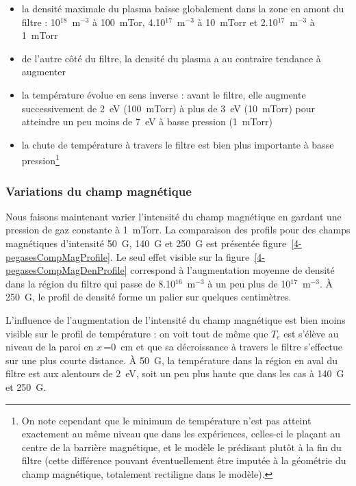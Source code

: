 \begin{refsection}
	\begin{itemize}
	  \item la densité maximale du plasma baisse globalement dans la zone en amont
	  du filtre : 10$^{18}$~m$^{-3}$ à 100~mTor, 4.10$^{17}$~m$^{-3}$ à 10~mTorr et
	  2.10$^{17}$~m$^{-3}$ à 1~mTorr
	  \item de l'autre côté du filtre, la densité du plasma a au contraire
	  tendance à augmenter
	  \item la température évolue en sens inverse : avant le filtre, elle augmente
	  successivement de 2~eV (100~mTorr) à plus de 3~eV (10~mTorr) pour atteindre
	  un peu moins de 7~eV à basse pression (1~mTorr) 
	  \item la chute de température à travers le
	  filtre est bien plus importante à basse pression\footnote{On note cependant que le minimum de température n'est pas atteint exactement
au même niveau que dans les expériences, celles-ci le plaçant au centre de la
barrière magnétique, et le modèle le prédisant plutôt à la fin du filtre (cette
différence pouvant éventuellement être imputée à la géométrie du champ
magnétique, totalement rectiligne dans le modèle).}
	\end{itemize}
	


	\subsubsection{Variations du champ magnétique}
	
	Nous faisons maintenant varier l'intensité du champ magnétique en gardant une
	pression de gaz constante à 1~mTorr. La comparaison des profils pour des champs
	magnétiques d'intensité 50~G, 140~G et 250~G est présentée
	figure~\ref{4-pegasesCompMagProfile}. Le seul effet visible sur la
	figure~\ref{4-pegasesCompMagDenProfile} correspond à l'augmentation moyenne de
	densité dans la région du filtre qui passe de 8.10$^{16}$~m$^{-3}$ à un peu
	plus de 10$^{17}$~m$^{-3}$. À 250~G, le profil de densité forme un palier
	sur quelques centimètres.
	
	L'influence de l'augmentation de l'intensité du champ magnétique est bien moins
	visible sur le profil de température : on voit tout de même que $T_e$ est
	s'élève au niveau de la paroi en $x\,$=0~cm et que sa décroissance à travers le
	filtre s'effectue sur une plus courte distance. À 50~G, la température dans la
	région en aval du filtre est aux alentours de 2~eV, soit un peu plus haute que
	dans les cas à 140~G et 250~G.
	

\end{refsection}
